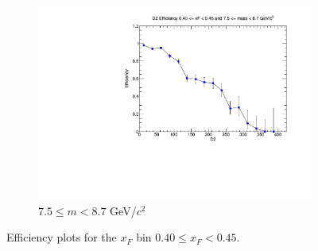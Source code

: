 \documentclass[11pt]{article}
\begin{document}
\begin{figure}[p]
\begin{subfigure}[b]{0.32\textwidth}
        \includegraphics[width=\textwidth]{./kTrackerEfficiencyPlots/D2_Efficiency_xF8_mass10.pdf}
        \caption{$7.5 \leq m < 8.7$ GeV/$c^2$}
    \end{subfigure}
    \caption{Efficiency plots for the $x_F$ bin $0.40 \leq x_F < 0.45$.}
\end{figure}
\end{document}
